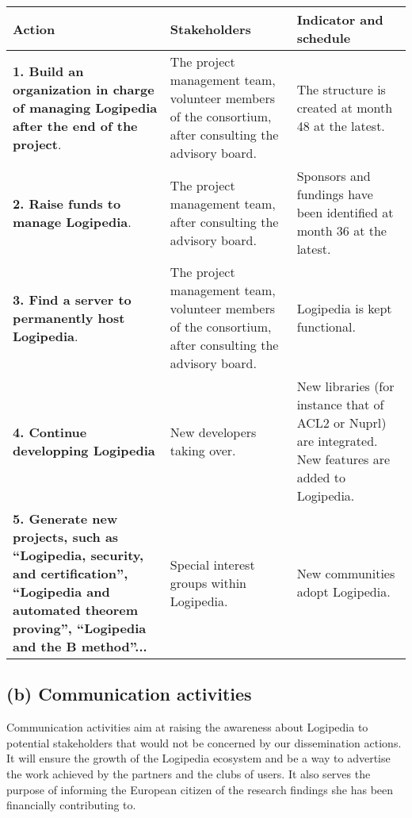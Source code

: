 \begin{longtable}{|p{}|p{}|p{}|}
\hline
{\bf Action}
&
{\bf Stakeholders}
&
{\bf Indicator and schedule}
\\
\hline
{\bf 1. Build an organization in charge of managing Logipedia
after the end of the project}.
&
The project management team, volunteer members of the consortium,
after consulting the advisory board.
&
The structure is created at month 48 at the latest.
\\
\hline
{\bf 2. Raise funds to manage Logipedia}.
&
The project management team, after consulting the advisory board.
&
Sponsors and fundings have been identified at month 36 at the latest.
\\
\hline   
{\bf 3. Find a server to permanently host Logipedia}.
&
The project management team, volunteer members of the consortium,
after consulting the advisory board.
&
Logipedia is kept functional.
\\
\hline
{\bf 4. Continue developping Logipedia}
&
New developers taking over.
&
New libraries (for instance that of ACL2 or Nuprl) are integrated.
New features are added to Logipedia.
\\
\hline
{\bf 5. Generate new projects, such as ``Logipedia, security, and
certification'', ``Logipedia and automated theorem proving'',
``Logipedia and the B method''...}
&
Special interest groups within Logipedia. 
&
New communities adopt Logipedia.
\\
\hline
\end{longtable}

\subsection*{(b) Communication activities}

Communication activities aim at raising the awareness about Logipedia
to potential stakeholders that would not be concerned by our
dissemination actions. It will ensure the growth of the Logipedia
ecosystem and be a way to advertise the work achieved by the partners
and the clubs of users. It also serves the purpose of informing the
European citizen of the research findings she has been financially
contributing to.

